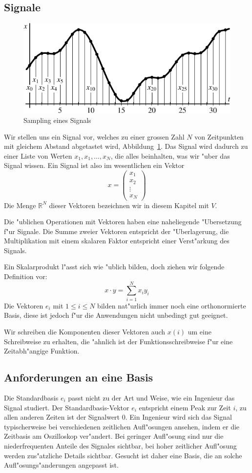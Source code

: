 \subsection{Signale}
\begin{figure}
\begin{center}
\includegraphics[width=0.9\hsize]{images/signal-1}
\end{center}
\caption{Sampling eines Signals\label{signal:vector}}
\end{figure}
Wir stellen uns ein Signal vor, welches zu einer grossen Zahl $N$
von Zeitpunkten mit gleichem Abstand abgetastet wird,
Abbildung~\ref{signal:vector}. Das Signal
wird dadurch zu einer Liste von Werten $x_1,x_1,\dots,x_N$, die
alles beinhalten, was wir "uber das Signal wissen. Ein Signal
ist also im wesentlichen ein Vektor
$$
x=\begin{pmatrix}x_1\\x_2\\\vdots\\x_N\end{pmatrix}
$$
Die Menge $\mathbb R^N$ dieser Vektoren bezeichnen wir in diesem
Kapitel mit $V$. 

Die "ublichen Operationen mit Vektoren haben eine naheliegende
"Ubersetzung f"ur Signale. Die Summe zweier Vektoren entspricht
der "Uberlagerung, die Multiplikation mit einem skalaren Faktor
entspricht einer Verst"arkung des Signals. 

Ein Skalarprodukt l"asst sich wie "ublich bilden, doch ziehen
wir folgende Definition vor:
$$
x\cdot y=\sum_{i=1}^Nx_iy_i
$$
Die Vektoren $e_i$ mit $1\le i\le N$ bilden nat"urlich immer noch
eine orthonormierte Basis, diese ist jedoch f"ur die Anwendungen
nicht unbedingt gut geeignet.

Wir schreiben die Komponenten dieser Vektoren auch $x(i)$ um
eine Schreibweise zu erhalten, die "ahnlich ist der Funktionsschreibweise
f"ur eine Zeitabh"angige Funktion.

\subsection{Anforderungen an eine Basis}
Die Standardbasis $e_i$ passt nicht zu der Art und Weise, wie ein
Ingenieur das Signal studiert. Der Standardbasis-Vektor $e_i$
entspricht einem Peak zur Zeit $i$, zu allen anderen Zeiten
ist der Signalwert $0$.
Ein Ingenieur wird sich das Signal
typischerweise bei verschiedenen zeitlichen Aufl"osungen
ansehen, indem er die Zeitbasis am Oszilloskop ver"andert.
Bei geringer Aufl"osung sind nur die niederfrequenten
Anteile des Signales sichtbar, bei hoher zeitlicher Aufl"osung
werden zus"atzliche Details sichtbar.
Gesucht ist daher eine Basis, die an solche Aufl"osungs"anderungen
angepasst ist.

